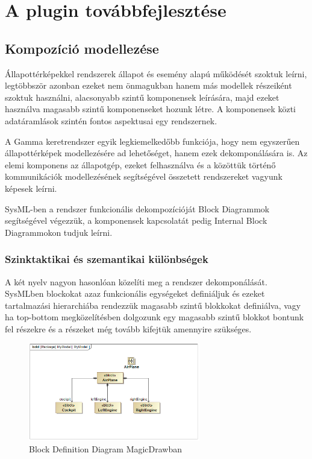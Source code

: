 \chapter{A plugin továbbfejlesztése}

\section{Kompozíció modellezése}
Állapottérképekkel rendszerek állapot és esemény alapú működését szoktuk leírni, legtöbbször azonban ezeket nem önmagukban hanem más modellek részeiként szoktuk használni, alacsonyabb szintű komponensek leírására, majd ezeket használva magasabb szintű komponenseket hozunk létre. A komponensek közti adatáramlások szintén fontos aspektusai egy rendszernek.


A Gamma keretrendszer egyik legkiemelkedőbb funkciója, hogy nem egyszerűen állapottérképek modellezésére ad lehetőséget, hanem ezek dekomponálására is. Az elemi komponens az állapotgép, ezeket felhasználva és a közöttük történő kommunikációk modellezésének segítségével összetett rendszereket vagyunk képesek leírni.

SysML-ben a rendszer funkcionális dekompozícióját Block Diagrammok segítségével végezzük, a komponensek kapcsolatát pedig Internal Block Diagrammokon tudjuk leírni.

\subsection{Szinktaktikai és szemantikai különbségek}

A két nyelv nagyon hasonlóan közelíti meg a rendszer dekomponálását. SysMLben blockokat azaz funkcionális egységeket definiáljuk és ezeket tartalmazási hierarchiába rendezzük magasabb szintű blokkokat definiálva, vagy ha top-bottom megközelítésben dolgozunk egy magasabb szintű blokkot bontunk fel részekre és a részeket még tovább kifejtük amennyire szükséges.

\begin{figure}[!ht]
	\centering
	\includegraphics[width=75mm]{figures/examplebdd.png}
	\caption{Block Definition Diagram MagicDrawban}
\end{figure}

